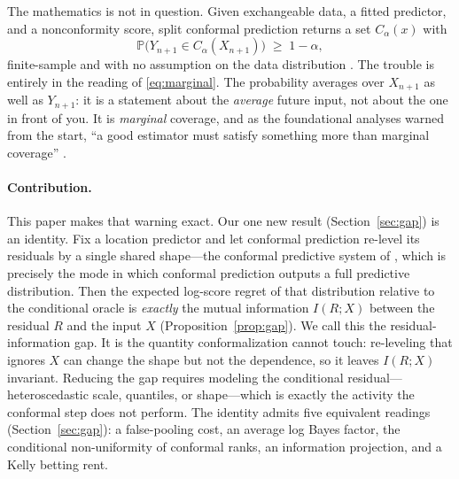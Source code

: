 \documentclass[11pt]{article}
\theoremstyle{definition}
\renewcommand{\Pr}{\mathbb{P}}
\begin{document}
The mathematics is not in question. Given exchangeable data, a fitted predictor, and a
nonconformity score, split conformal prediction returns a set $C_\alpha(x)$ with
\begin{equation}\label{eq:marginal}
  \Pr\!\big(Y_{n+1}\in C_\alpha(X_{n+1})\big)\;\ge\;1-\alpha,
\end{equation}
finite-sample and with no assumption on the data distribution
\citep{vovk2005algorithmic,lei2018distribution,angelopoulos2023gentle}. The trouble is
entirely in the reading of \eqref{eq:marginal}. The probability averages over $X_{n+1}$ as
well as $Y_{n+1}$: it is a statement about the \emph{average} future input, not about the
one in front of you. It is \emph{marginal} coverage, and as the foundational analyses
warned from the start, ``a good estimator must satisfy something more than marginal
coverage'' \citep{lei2014distribution}.

\paragraph{Contribution.}
This paper makes that warning exact. Our one new result (Section~\ref{sec:gap}) is an
identity. Fix a location predictor and let conformal prediction re-level its residuals by a
single shared shape---the conformal predictive system of \citet{vovk2019nonparametric},
which is precisely the mode in which conformal prediction outputs a full predictive
distribution. Then the expected log-score regret of that distribution relative to the
conditional oracle is \emph{exactly} the mutual information $I(R;X)$ between the residual
$R$ and the input $X$ (Proposition~\ref{prop:gap}). We call this the
residual-information gap. It is the quantity conformalization cannot touch: re-leveling
that ignores $X$ can change the shape but not the dependence, so it leaves $I(R;X)$
invariant. Reducing the gap requires modeling the conditional residual---heteroscedastic
scale, quantiles, or shape---which is exactly the activity the conformal step does not
perform. The identity admits five equivalent readings (Section~\ref{sec:gap}): a
false-pooling cost, an average log Bayes factor, the conditional non-uniformity of
conformal ranks, an information projection, and a Kelly betting rent.
\end{document}
